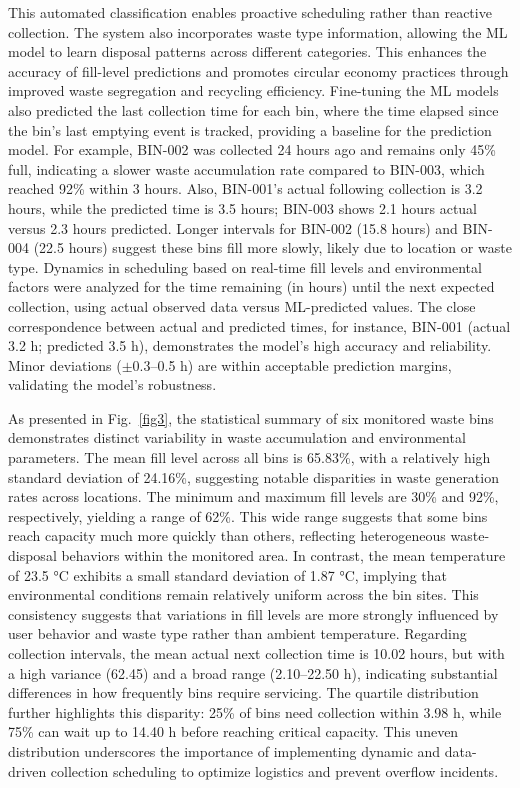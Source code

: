 \documentclass[final,5p,times,twocolumn]{elsarticle}
\begin{document}
This automated classification enables proactive scheduling rather than reactive collection. The system also incorporates waste type information, allowing the ML model to learn disposal patterns across different categories. This enhances the accuracy of fill-level predictions and promotes circular economy practices through improved waste segregation and recycling efficiency. Fine-tuning the ML models also predicted the last collection time for each bin, where the time elapsed since the bin's last emptying event is tracked, providing a baseline for the prediction model. For example, BIN-002 was collected 24 hours ago and remains only 45\% full, indicating a slower waste accumulation rate compared to BIN-003, which reached 92\% within 3 hours. Also, BIN-001's actual following collection is 3.2 hours, while the predicted time is 3.5 hours; BIN-003 shows 2.1 hours actual versus 2.3 hours predicted. Longer intervals for BIN-002 (15.8 hours) and BIN-004 (22.5 hours) suggest these bins fill more slowly, likely due to location or waste type. Dynamics in scheduling based on real-time fill levels and environmental factors were analyzed for the time remaining (in hours) until the next expected collection, using actual observed data versus ML-predicted values. The close correspondence between actual and predicted times, for instance, BIN-001 (actual 3.2 h; predicted 3.5 h), demonstrates the model's high accuracy and reliability. Minor deviations ($\pm$0.3--0.5 h) are within acceptable prediction margins, validating the model's robustness. 

As presented in Fig.~\ref{fig3}, the statistical summary of six monitored waste bins demonstrates distinct variability in waste accumulation and environmental parameters. The mean fill level across all bins is 65.83\%, with a relatively high standard deviation of 24.16\%, suggesting notable disparities in waste generation rates across locations. The minimum and maximum fill levels are 30\% and 92\%, respectively, yielding a range of 62\%. This wide range suggests that some bins reach capacity much more quickly than others, reflecting heterogeneous waste-disposal behaviors within the monitored area. In contrast, the mean temperature of 23.5 °C exhibits a small standard deviation of 1.87 °C, implying that environmental conditions remain relatively uniform across the bin sites. This consistency suggests that variations in fill levels are more strongly influenced by user behavior and waste type rather than ambient temperature. Regarding collection intervals, the mean actual next collection time is 10.02 hours, but with a high variance (62.45) and a broad range (2.10--22.50 h), indicating substantial differences in how frequently bins require servicing. The quartile distribution further highlights this disparity: 25\% of bins need collection within 3.98 h, while 75\% can wait up to 14.40 h before reaching critical capacity. This uneven distribution underscores the importance of implementing dynamic and data-driven collection scheduling to optimize logistics and prevent overflow incidents.
\end{document}
